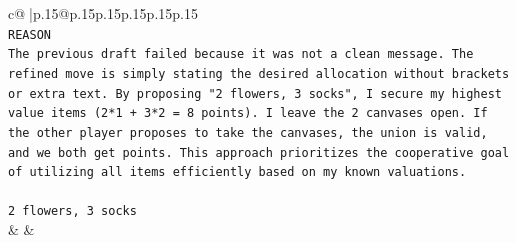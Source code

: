 \documentclass{article}
\begin{document}
{\begin{supertabular}{c@{$\;$}|p{.15\linewidth}@{}p{.15\linewidth}p{.15\linewidth}p{.15\linewidth}p{.15\linewidth}p{.15\linewidth}}
{{{\\ 
\texttt{REASON} \\
\texttt{The previous draft failed because it was not a clean message. The refined move is simply stating the desired allocation without brackets or extra text. By proposing "2 flowers, 3 socks", I secure my highest value items (2*1 + 3*2 = 8 points). I leave the 2 canvases open. If the other player proposes to take the canvases, the union is valid, and we both get points. This approach prioritizes the cooperative goal of utilizing all items efficiently based on my known valuations.} \\
\\ 
\texttt{2 flowers, 3 socks} \\
            }
        }
    }
    & & \\ \\


\end{supertabular}}
\end{document}
